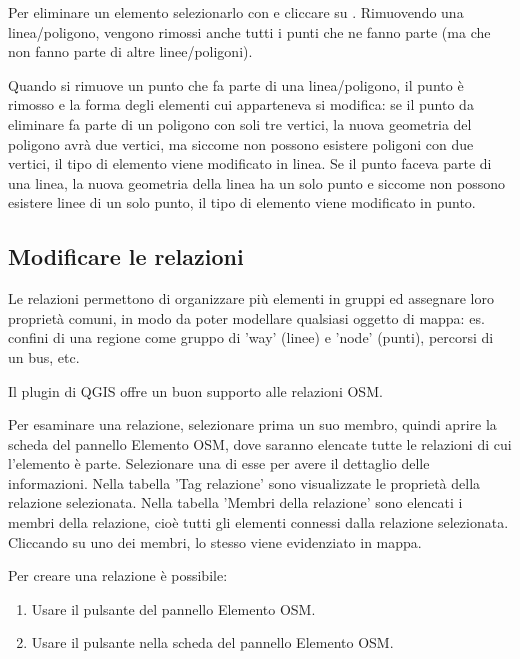 Per eliminare un elemento selezionarlo con  e cliccare su 
. 
Rimuovendo una linea/poligono, vengono rimossi anche 
tutti i punti che ne fanno parte (ma che non fanno parte di altre linee/poligoni).  

Quando si rimuove un punto che fa parte di una linea/poligono, il punto è rimosso e la forma degli 
elementi cui apparteneva si modifica: se il punto da eliminare fa parte di un poligono con soli 
tre vertici, la nuova geometria del poligono avrà due vertici, ma siccome non possono 
esistere poligoni con due vertici, il tipo di elemento viene modificato in linea.
Se il punto faceva parte di una linea, la nuova geometria della linea ha un solo punto e siccome 
non possono esistere linee di un solo punto, il tipo di elemento viene modificato in punto.

\subsection{Modificare le relazioni}\label{editing_osm_relation}

Le relazioni permettono di organizzare più elementi in gruppi ed assegnare loro 
proprietà comuni, in modo da poter modellare qualsiasi oggetto di mappa: es. confini
di una regione come gruppo di 'way' (linee) e 'node' (punti), percorsi di un bus, etc.

Il plugin di QGIS offre un buon supporto alle relazioni OSM.

\label{examrelation}

Per esaminare una relazione, selezionare prima un suo membro, quindi aprire la
scheda  del pannello Elemento OSM, dove saranno elencate tutte 
le relazioni di cui l'elemento è parte. Selezionare una di esse per avere il 
dettaglio delle informazioni. Nella tabella 'Tag relazione' sono visualizzate le 
proprietà della relazione selezionata. Nella tabella 'Membri della relazione'
sono elencati i membri della relazione, cioè tutti gli elementi connessi dalla relazione selezionata.
Cliccando su uno dei membri, lo stesso viene evidenziato in mappa.


Per creare una relazione è possibile:

\begin{enumerate}
\item Usare il pulsante  del pannello Elemento OSM.
\item Usare il pulsante  nella scheda  
del pannello Elemento OSM.
\end{enumerate}

